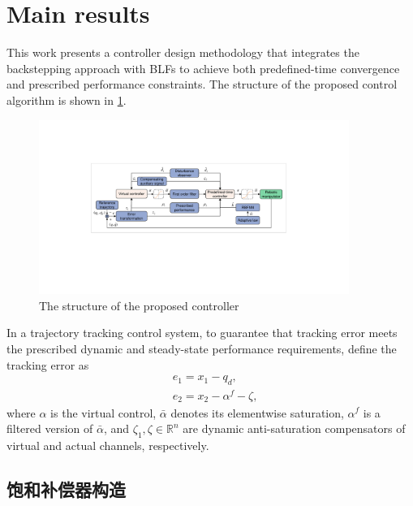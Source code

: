 \documentclass[pdflatex,sn-mathphys-num]{sn-jnl}%
\theoremstyle{thmstyleone}%
\theoremstyle{thmstyletwo}%
\theoremstyle{thmstylethree}%
\begin{document}
\section{Main results}


This work presents a controller design methodology that integrates the backstepping approach with BLFs to achieve both predefined-time convergence and prescribed performance constraints. The structure of the proposed control algorithm is shown in \cref{fig:2}.
\begin{figure}[H]
	\centering
	\includegraphics[width=0.9\textwidth]{fig2.pdf}
	\caption{The structure of the proposed controller}
	\label{fig:2}
\end{figure}



\par In a trajectory tracking control system, to  guarantee that tracking error meets the prescribed dynamic and steady-state performance requirements, define the tracking error as
\begin{subequations}\label{eq:20}
	\begin{align}
		&e_{1} = x_{1} - q_{d}, \\
	  &e_{2} = x_{2} -\alpha^{f}-\zeta,
	\end{align}
	\end{subequations}
	where $\alpha$ is the virtual control, $\bar{\alpha}$ denotes its elementwise saturation, $\alpha^{f}$ is a filtered version of $\bar{\alpha}$, and $\zeta_{1},\zeta \in\mathbb{R}^{n}$ are dynamic anti-saturation compensators of virtual and actual channels, respectively.


\subsection{饱和补偿器构造}
\end{document}
